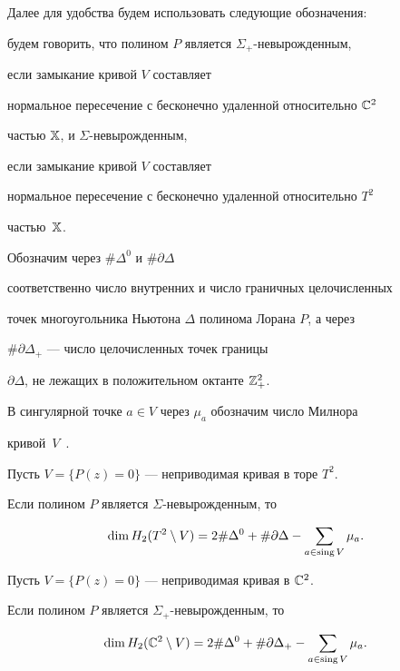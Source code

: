 Далее для удобства будем использовать следующие обозначения:


будем говорить, что полином $P$ является $\Sigma_+$-невырожденным,


если замыкание кривой $V$ составляет


нормальное пересечение с бесконечно удаленной относительно $\Bbb C^2$


частью $\Bbb X$, и $\Sigma$-невырожденным,


если замыкание кривой $V$ составляет


нормальное пересечение с бесконечно удаленной относительно $T^2$


частью~$\Bbb X$.





Обозначим через $\#\Delta^0$ и $\#\partial\Delta$


соответственно число внутренних и число граничных целочисленных


точек многоугольника Ньютона $\Delta$ полинома Лорана $P$, а через


$\#\partial\Delta_+$ --- число целочисленных точек границы


$\partial\Delta$, не лежащих в положительном октанте $\Bbb Z^2_+$.


В сингулярной точке $a\in V$ через $\mu_a$ обозначим число Милнора


кривой~$V$~\cite{M}.





\begin{thmnonum}


Пусть $V=\{P(z)=0\}$ --- неприводимая кривая в торе $T^2$.


Если полином $P$ является $\Sigma$-невырожденным, то


\begin{equation}


\label{odin}


\dim H_2(T^2\setminus V)=2 \#\Delta^0 +


\#\partial\Delta -


\sum\limits_{a\in \sing V} \mu_a.


\end{equation}





Пусть $V=\{P(z)=0\}$ --- неприводимая кривая в $\Bbb C^2$.


Если полином $P$ является $\Sigma_+$-невырожденным, то


\begin{equation}


\label{dva}


\dim H_2(\Bbb C^2\setminus V)=2 \#\Delta^0 +


\#\partial\Delta_+ -


\sum\limits_{a\in \sing V} \mu_a.


\end{equation}


\end{thmnonum}





